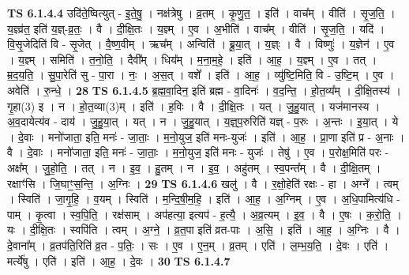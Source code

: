 \documentclass[17pt]{extarticle}
\begin{document}
                  \newline
                                \textbf{ TS 6.1.4.4} \newline
                  उदि॑ते॒ष्वित्युत् - इ॒ते॒षु॒ । नक्ष॑त्रेषु । व्र॒तम् । कृ॒णु॒त॒ । इति॑ । वाच᳚म् । वीति॑ । सृ॒ज॒ति॒ । य॒ज्ञ्व्र॑त॒ इति॑ य॒ज्ञ्-व्र॒तः॒ । वै । दी॒क्षि॒तः । य॒ज्ञ्म् । ए॒व । अ॒भीति॑ । वाच᳚म् । वीति॑ । सृ॒ज॒ति॒ । यदि॑ । वि॒सृ॒जेदिति॑ वि - सृ॒जेत् । वै॒ष्ण॒वीम् । ऋच᳚म् । अन्विति॑ । ब्रू॒या॒त् । य॒ज्ञ्ः । वै । विष्णुः॑ । य॒ज्ञेन॑ । ए॒व । य॒ज्ञ्म् । समिति॑ । त॒नो॒ति॒ । दैवी᳚म् । धिय᳚म् । म॒ना॒म॒हे॒ । इति॑ । आ॒ह॒ । य॒ज्ञ्म् । ए॒व । तत् । म्र॒द॒य॒ति॒ । सु॒पा॒रेति॑ सु - पा॒रा । नः॒ । अ॒स॒त् । वशे᳚ । इति॑ । आ॒ह॒ । व्यु॑ष्टि॒मिति॒ वि - उ॒ष्टि॒म् । ए॒व । अवेति॑ । रु॒न्धे॒ । \textbf{  28} \newline
                  \newline
                                \textbf{ TS 6.1.4.5} \newline
                  ब्र॒ह्म॒वा॒दिन॒ इति॑ ब्रह्म - वा॒दिनः॑ । व॒द॒न्ति॒ । हो॒त॒व्य᳚म् । दी॒क्षि॒तस्य॑ । गृ॒हा(3) इ । न । हो॒त॒व्या(3)म् । इति॑ । ह॒विः । वै । दी॒क्षि॒तः । यत् । जु॒हु॒यात् । यज॑मानस्य । अ॒व॒दायेत्य॑व - दाय॑ । जु॒हु॒या॒त् । यत् । न । जु॒हु॒यात् । य॒ज्ञ्॒प॒रुरिति॑ यज्ञ् - प॒रुः । अ॒न्तः । इ॒या॒त् । ये । दे॒वाः । मनो॑जाता॒ इति॒ मनः॑ - जा॒ताः॒ । म॒नो॒युज॒ इति॑ मनः-युजः॑ । इति॑ । आ॒ह॒ । प्रा॒णा इति॑ प्र - अ॒नाः । वै । दे॒वाः । मनो॑जाता॒ इति॒ मनः॑ - जा॒ताः॒ । म॒नो॒युज॒ इति॑ मनः - युजः॑ । तेषु॑ । ए॒व । प॒रोक्ष॒मिति॑ परः - अक्ष᳚म् । जु॒हो॒ति॒ । तत् । न । इ॒व॒ । हु॒तम् । न । इ॒व॒ । अहु॑तम् । स्व॒पन्त᳚म् । वै । दी॒क्षि॒तम् । रक्षाꣳ॑सि । जि॒घाꣳ॒॒स॒न्ति॒ । अ॒ग्निः । \textbf{  29} \newline
                  \newline
                                \textbf{ TS 6.1.4.6} \newline
                  खलु॑ । वै । र॒क्षो॒हेति॑ रक्षः - हा । अग्ने᳚ । त्वम् । स्विति॑ । जा॒गृ॒हि॒ । व॒यम् । स्विति॑ । म॒न्दि॒षी॒म॒हि॒ । इति॑ । आ॒ह॒ । अ॒ग्निम् । ए॒व । अ॒धि॒पामित्य॑धि - पाम् । कृ॒त्वा । स्व॒पि॒ति॒ । रक्ष॑साम् । अप॑हत्या॒ इत्यप॑ - ह॒त्यै॒ । अ॒व्र॒त्यम् । इ॒व॒ । वै । ए॒षः । क॒रो॒ति॒ । यः । दी॒क्षि॒तः । स्वपि॑ति । त्वम् । अ॒ग्ने॒ । व्र॒त॒पा इति॑ व्रत-पाः । अ॒सि॒ । इति॑ । आ॒ह॒ । अ॒ग्निः । वै । दे॒वाना᳚म् । व्र॒तप॑ति॒रिति॑ व्र॒त - प॒तिः॒ । सः । ए॒व । ए॒न॒म् । व्र॒तम् । एति॑ । ल॒म्भ॒य॒ति॒ । दे॒वः । एति॑ । मर्त्ये॑षु । एति॑ । इति॑ । आ॒ह॒ । दे॒वः । \textbf{  30} \newline
                  \newline
                                \textbf{ TS 6.1.4.7} \newline
\end{document}
